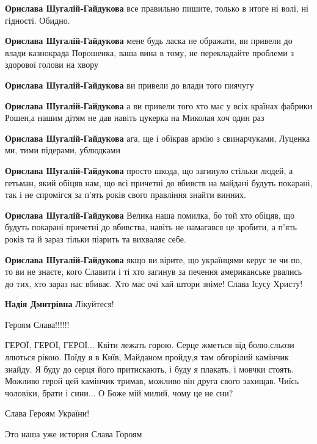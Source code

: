 \begin{itemize}
\begin{itemize}
\textbf{Орислава Шугалій-Гайдукова} все правильно пишите, только в итоге ні волі, ні гідності. Обидно.

\textbf{Орислава Шугалій-Гайдукова} мене будь ласка не ображати, ви привели до влади казнокрада Порошенка, ваша вина в тому, не перекладайте проблеми з здорової голови на хвору

\textbf{Орислава Шугалій-Гайдукова} ви привели до влади того пиячугу

\textbf{Орислава Шугалій-Гайдукова} а ви привели того хто має у всіх країнах фабрики Рошен,а нашим дітям не дав навіть цукерка на Миколая хоч один раз

\textbf{Орислава Шугалій-Гайдукова} ага, ще і обікрав армію з свинарчуками, Луценка ми, тими підерами, ублюдками

\textbf{Орислава Шугалій-Гайдукова} просто шкода, що загинуло стільки людей, а гетьман, який обіцяв нам, що всі причетні до вбивств на майдані будуть покарані, так і не спромігся за п'ять років свого правління знайти винних.

\textbf{Орислава Шугалій-Гайдукова} Велика наша помилка, бо той хто обіцяв, що будуть покарані причетні до вбивства, навіть не намагався це зробити, а п'ять років та й зараз тільки піарить та вихваляє себе.

\textbf{Орислава Шугалій-Гайдукова} якщо ви вірите, що українцями керує зе чи по, то ви не знаєте, кого Славити і ті хто загинув за печення американське рвались до тих, хто зараз нас вбиває. Хто має очі хай штори зніме!
Слава Ісусу Христу!

\textbf{Надія Дмитрівна} Лікуйтеся!
\end{itemize} %

Героям Слава!!!!!!


ГЕРОЇ, ГЕРОЇ, ГЕРОЇ... Квіти лежать горою. Серце жметься від болю,сльози
ллються рікою. Поїду я в Київ, Майданом пройду,я там обгорілий камінчик знайду.
Я буду до серця його притискають, і буду я плакать, і мовчки стоять. Можливо
герой цей камінчик тримав, можливо він друга свого захищав. Чиїсь чоловіки,
брати і сини... О Боже мій милий, чому це не сни?


Слава Героям України!

Это наша уже история Слава Гороям


\end{itemize}
